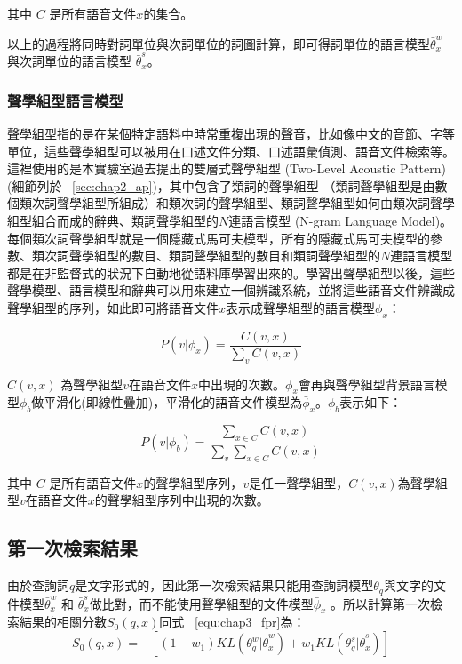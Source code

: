 其中 $C$ 是所有語音文件$x$的集合。

以上的過程將同時對詞單位與次詞單位的詞圖計算，即可得詞單位的語言模型$\bar{\theta}_x^w$與次詞單位的語言模型 $\bar{\theta}_x^s$。

\subsubsection{聲學組型語言模型}
\label{sec:chap3_apd}
聲學組型指的是在某個特定語料中時常重複出現的聲音，比如像中文的音節、字等單位，這些聲學組型可以被用在口述文件分類、口述語彙偵測、語音文件檢索等。這裡使用的是本實驗室過去提出的雙層式聲學組型 (Two-Level Acoustic Pattern)~\cite{chung2013unsupervised} (細節列於 ~\ref{sec:chap2_ap})，其中包含了類詞的聲學組型 （類詞聲學組型是由數個類次詞聲學組型所組成）和類次詞的聲學組型、類詞聲學組型如何由類次詞聲學組型組合而成的辭典、類詞聲學組型的$N$連語言模型 (N-gram Language
Model)。每個類次詞聲學組型就是一個隱藏式馬可夫模型，所有的隱藏式馬可夫模型的參數、類次詞聲學組型的數目、類詞聲學組型的數目和類詞聲學組型的$N$連語言模型都是在非監督式的狀況下自動地從語料庫學習出來的。學習出聲學組型以後，這些聲學模型、語言模型和辭典可以用來建立一個辨識系統，並將這些語音文件辨識成聲學組型的序列，如此即可將語音文件$x$表示成聲學組型的語言模型$\phi_x$：

\begin{equation}
P(v|\phi_x) = \frac{C(v, x)}{\sum_v C(v, x)}
\end{equation}

$C(v, x)$ 為聲學組型$v$在語音文件$x$中出現的次數。$\phi_x$會再與聲學組型背景語言模型$\phi_b$做平滑化(即線性疊加)，平滑化的語音文件模型為$\bar{\phi}_x$。$\phi_b$表示如下：

\begin{equation}
P(v|\phi_b) = \frac{\sum_{x\in C} C(v, x)}{\sum_v\sum_{x\in C} C(v, x)}
\end{equation}

其中 $C$ 是所有語音文件$x$的聲學組型序列，$v$是任一聲學組型，$C(v, x)$為聲學組型$v$在語音文件$x$的聲學組型序列中出現的次數。

\subsection{第一次檢索結果}
由於查詢詞$q$是文字形式的，因此第一次檢索結果只能用查詢詞模型$\theta_q$與文字的文件模型$\bar{\theta}_x^w$ 和 $\bar{\theta}_x^s$做比對，而不能使用聲學組型的文件模型$\bar{\phi}_x$
。所以計算第一次檢索結果的相關分數$S_0(q, x)$同式 ~\ref{equ:chap3_fpr}為：
\begin{equation}
S_0(q, x) = -[(1-w_1)KL(\theta_q^{w}|\bar{\theta}_x^{w}) + w_1KL(\theta_q^{s}|\bar{\theta}_x^{s})]
\end{equation}

